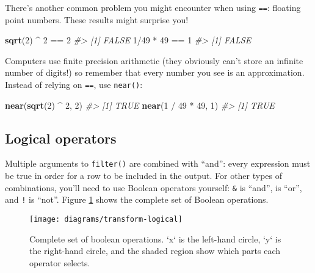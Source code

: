 \documentclass[]{book}
\newenvironment{Shaded}{\begin{snugshade}}{\end{snugshade}}
\newcommand{\KeywordTok}[1]{\textcolor[rgb]{0.13,0.29,0.53}{\textbf{{#1}}}}
\newcommand{\DecValTok}[1]{\textcolor[rgb]{0.00,0.00,0.81}{{#1}}}
\newcommand{\StringTok}[1]{\textcolor[rgb]{0.31,0.60,0.02}{{#1}}}
\newcommand{\CommentTok}[1]{\textcolor[rgb]{0.56,0.35,0.01}{\textit{{#1}}}}
\newcommand{\NormalTok}[1]{{#1}}
\begin{document}
There's another common problem you might encounter when using
\texttt{==}: floating point numbers. These results might surprise you!

\begin{Shaded}
\begin{Highlighting}[]
\KeywordTok{sqrt}\NormalTok{(}\DecValTok{2}\NormalTok{) ^}\StringTok{ }\DecValTok{2} \NormalTok{==}\StringTok{ }\DecValTok{2}
\CommentTok{#> [1] FALSE}
\DecValTok{1}\NormalTok{/}\DecValTok{49} \NormalTok{*}\StringTok{ }\DecValTok{49} \NormalTok{==}\StringTok{ }\DecValTok{1}
\CommentTok{#> [1] FALSE}
\end{Highlighting}
\end{Shaded}

Computers use finite precision arithmetic (they obviously can't store an
infinite number of digits!) so remember that every number you see is an
approximation. Instead of relying on \texttt{==}, use \texttt{near()}:

\begin{Shaded}
\begin{Highlighting}[]
\KeywordTok{near}\NormalTok{(}\KeywordTok{sqrt}\NormalTok{(}\DecValTok{2}\NormalTok{) ^}\StringTok{ }\DecValTok{2}\NormalTok{,  }\DecValTok{2}\NormalTok{)}
\CommentTok{#> [1] TRUE}
\KeywordTok{near}\NormalTok{(}\DecValTok{1} \NormalTok{/}\StringTok{ }\DecValTok{49} \NormalTok{*}\StringTok{ }\DecValTok{49}\NormalTok{, }\DecValTok{1}\NormalTok{)}
\CommentTok{#> [1] TRUE}
\end{Highlighting}
\end{Shaded}

\subsection{Logical operators}\label{logical-operators}

Multiple arguments to \texttt{filter()} are combined with ``and'': every
expression must be true in order for a row to be included in the output.
For other types of combinations, you'll need to use Boolean operators
yourself: \texttt{\&} is ``and'', \texttt{\textbar{}} is ``or'', and
\texttt{!} is ``not''. Figure \ref{fig:bool-ops} shows the complete set
of Boolean operations.

\begin{figure}

{\centering \texttt{[image: diagrams/transform-logical]} 

}

\caption{Complete set of boolean operations. `x` is the left-hand circle, `y` is the right-hand circle, and the shaded region show which parts each operator selects.}\label{fig:bool-ops}
\end{figure}
\end{document}
